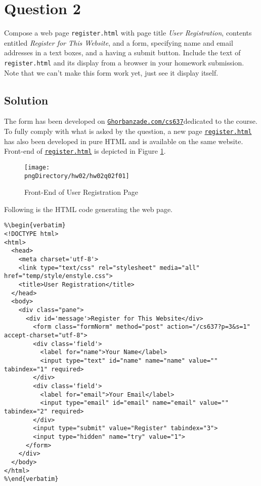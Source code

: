 
\section*{Question 2}

Compose a web page \texttt{register.html} with page title \textit{User Registration}, contents entitled \textit{Register for This Website}, and a form, specifying name and email addresses in a text boxes, and a having a submit button. Include the text of \texttt{register.html} and its display from a browser in your homework submission. Note that we can't make this form work yet, just see it display itself.

\subsection*{Solution}

The form has been developed on \href{http://ghorbanzade.com/cs637?p=3&s=1}{\texttt{Ghorbanzade.com/cs637}}dedicated to the course. To fully comply with what is asked by the question, a new page \href{http://ghorbanzade.com/cs637/register.html}{\texttt{register.html}} has also been developed in pure HTML and is available on the same website. Front-end of \href{http://ghorbanzade.com/cs637/register.html}{\texttt{register.html}} is depicted in Figure \ref{fig1}.

\begin{figure}[H]\centering
\texttt{[image: \\pngDirectory/hw02/hw02q02f01]}
\caption{Front-End of User Registration Page}
\label{fig1}
\end{figure}

Following is the HTML code generating the web page.

\begin{lstlisting}
%\begin{verbatim}
<!DOCTYPE html>
<html>
  <head>
    <meta charset='utf-8'>
    <link type="text/css" rel="stylesheet" media="all" href="temp/style/enstyle.css">
    <title>User Registration</title>
  </head>
  <body>
    <div class="pane">
      <div id='message'>Register for This Website</div>
        <form class="formNorm" method="post" action="/cs637?p=3&s=1" accept-charset="utf-8">
        <div class='field'>
          <label for="name">Your Name</label>
          <input type="text" id="name" name="name" value="" tabindex="1" required>
        </div>
        <div class='field'>
          <label for="email">Your Email</label>
          <input type="email" id="email" name="email" value="" tabindex="2" required>
        </div>
        <input type="submit" value="Register" tabindex="3">
        <input type="hidden" name="try" value="1">
      </form>
    </div>
  </body>
</html>
%\end{verbatim}
\end{lstlisting}

